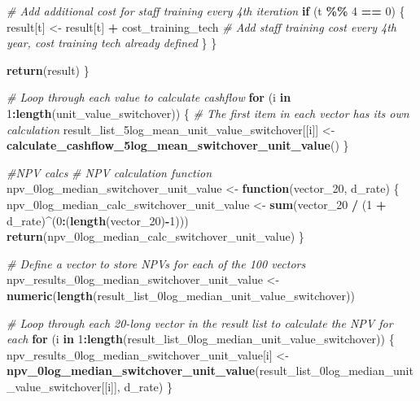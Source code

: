 \documentclass[
]{article}
\newenvironment{Shaded}{\begin{snugshade}}{\end{snugshade}}
\newcommand{\CommentTok}[1]{\textcolor[rgb]{0.56,0.35,0.01}{\textit{#1}}}
\newcommand{\ControlFlowTok}[1]{\textcolor[rgb]{0.13,0.29,0.53}{\textbf{#1}}}
\newcommand{\DecValTok}[1]{\textcolor[rgb]{0.00,0.00,0.81}{#1}}
\newcommand{\FunctionTok}[1]{\textcolor[rgb]{0.13,0.29,0.53}{\textbf{#1}}}
\newcommand{\NormalTok}[1]{#1}
\newcommand{\OtherTok}[1]{\textcolor[rgb]{0.56,0.35,0.01}{#1}}
\newcommand{\SpecialCharTok}[1]{\textcolor[rgb]{0.81,0.36,0.00}{\textbf{#1}}}
\begin{document}
\begin{Shaded}
\begin{Highlighting}[]
    \CommentTok{\# Add additional cost for staff training every 4th iteration}
    \ControlFlowTok{if}\NormalTok{ (t }\SpecialCharTok{\%\%} \DecValTok{4} \SpecialCharTok{==} \DecValTok{0}\NormalTok{) \{}
\NormalTok{      result[t] }\OtherTok{\textless{}{-}}\NormalTok{ result[t] }\SpecialCharTok{+}\NormalTok{ cost\_training\_tech  }\CommentTok{\# Add staff training cost every 4th year, cost training tech already defined}
\NormalTok{    \}}
\NormalTok{  \}}
  
  \FunctionTok{return}\NormalTok{(result)}
\NormalTok{\}}

\CommentTok{\# Loop through each value to calculate cashflow}
\ControlFlowTok{for}\NormalTok{ (i }\ControlFlowTok{in} \DecValTok{1}\SpecialCharTok{:}\FunctionTok{length}\NormalTok{(unit\_value\_switchover)) \{}
  \CommentTok{\# The first item in each vector has its own calculation}
\NormalTok{  result\_list\_5log\_mean\_unit\_value\_switchover[[i]] }\OtherTok{\textless{}{-}} \FunctionTok{calculate\_cashflow\_5log\_mean\_switchover\_unit\_value}\NormalTok{()}
\NormalTok{\}}



\CommentTok{\#NPV calcs}
\CommentTok{\# NPV calculation function}
\NormalTok{npv\_0log\_median\_switchover\_unit\_value }\OtherTok{\textless{}{-}} \ControlFlowTok{function}\NormalTok{(vector\_20, d\_rate) \{}
\NormalTok{  npv\_0log\_median\_calc\_switchover\_unit\_value }\OtherTok{\textless{}{-}} \FunctionTok{sum}\NormalTok{(vector\_20 }\SpecialCharTok{/}\NormalTok{ (}\DecValTok{1} \SpecialCharTok{+}\NormalTok{ d\_rate)}\SpecialCharTok{\^{}}\NormalTok{(}\DecValTok{0}\SpecialCharTok{:}\NormalTok{(}\FunctionTok{length}\NormalTok{(vector\_20)}\SpecialCharTok{{-}}\DecValTok{1}\NormalTok{)))}
  \FunctionTok{return}\NormalTok{(npv\_0log\_median\_calc\_switchover\_unit\_value)}
\NormalTok{\}}

\CommentTok{\# Define a vector to store NPVs for each of the 100 vectors}
\NormalTok{npv\_results\_0log\_median\_switchover\_unit\_value }\OtherTok{\textless{}{-}} \FunctionTok{numeric}\NormalTok{(}\FunctionTok{length}\NormalTok{(result\_list\_0log\_median\_unit\_value\_switchover))}

\CommentTok{\# Loop through each 20{-}long vector in the result list to calculate the NPV for each}
\ControlFlowTok{for}\NormalTok{ (i }\ControlFlowTok{in} \DecValTok{1}\SpecialCharTok{:}\FunctionTok{length}\NormalTok{(result\_list\_0log\_median\_unit\_value\_switchover)) \{}
\NormalTok{  npv\_results\_0log\_median\_switchover\_unit\_value[i] }\OtherTok{\textless{}{-}} \FunctionTok{npv\_0log\_median\_switchover\_unit\_value}\NormalTok{(result\_list\_0log\_median\_unit\_value\_switchover[[i]], d\_rate)}
\NormalTok{\}}



\end{Highlighting}
\end{Shaded}
\end{document}
